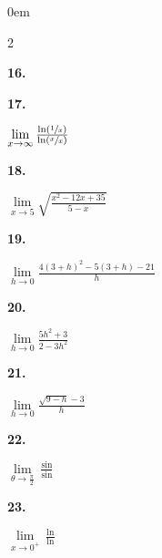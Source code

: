 \documentclass[12pt,]{book}
\theoremstyle{plain}
\theoremstyle{definition}
\numberwithin{equation}{section}
\newenvironment{exercisegroup}%
{\medskip\noindent}%
{\par\bigskip}%
\newlength{\exercisegroupindent}%
\newlength{\exercisegroupitemwidth}%
\newenvironment{exercisegrouplist}%
{\vspace{-\partopsep}%
\begin{adjustwidth}{\exercisegroupindent}{0em}}%
{\end{adjustwidth}%
\vspace{-\partopsep}%
\vspace{\baselineskip}}%
\newenvironment{exercisegroupbycol}[1]%
{\begin{exercisegrouplist}%
\vspace{-\multicolsep}%
\begin{multicols}{#1}%
\setlength{\parindent}{0em}%
\setlength{\exercisegroupitemwidth}{\linewidth}}%
{\end{multicols}%
\vspace{-\multicolsep}%
\end{exercisegrouplist}}%
\newenvironment{exercisegroupitem}[1]%
{\begin{minipage}[t]{\exercisegroupitemwidth}
\vspace{0pt}%
{\bfseries#1}%
\rule{0pt}{\baselineskip}}{\strut%
\end{minipage}%
\hspace{\columnsep}}%
\providecommand\phantomsection{}
\newcommand{\fe}[2]{\mathop{{#1}{\left(#2\right)}}}
\begin{document}
\begin{exercisegroup}
\begin{exercisegroupbycol}{2}
\begin{exercisegroupitem}{16. }
\end{exercisegroupitem}%
\par%
\begin{exercisegroupitem}{17. }\phantomsection\hypertarget{exercise-154}{\null}
\(\lim\limits_{x\to\infty}\frac{\fe{\ln}{\sfrac{1}{x}}}{\fe{\ln}{\sfrac{x}{x}}}\)%
\end{exercisegroupitem}%
\par%
\begin{exercisegroupitem}{18. }\phantomsection\hypertarget{exercise-155}{\null}
\(\lim\limits_{x\to5}\sqrt{\frac{x^2-12x+35}{5-x}}\)%
\end{exercisegroupitem}%
\par%
\begin{exercisegroupitem}{19. }\phantomsection\hypertarget{exercise-156}{\null}
\(\lim\limits_{h\to0}\frac{4(3+h)^2-5(3+h)-21}{h}\)%
\end{exercisegroupitem}%
\par%
\begin{exercisegroupitem}{20. }\phantomsection\hypertarget{exercise-157}{\null}
\(\lim\limits_{h\to0}\frac{5h^2+3}{2-3h^2}\)%
\end{exercisegroupitem}%
\par%
\begin{exercisegroupitem}{21. }\phantomsection\hypertarget{exercise-158}{\null}
\(\lim\limits_{h\to0}\frac{\sqrt{9-h}-3}{h}\)%
\end{exercisegroupitem}%
\par%
\begin{exercisegroupitem}{22. }\phantomsection\hypertarget{exercise-159}{\null}
\(\lim\limits_{\theta\to\frac{\pi}{2}}\frac{\fe{\sin}{\theta+\frac{\pi}{2}}}{\fe{\sin}{2\theta+\pi}}\)%
\end{exercisegroupitem}%
\par%
\begin{exercisegroupitem}{23. }\phantomsection\hypertarget{exercise-160}{\null}
\(\lim\limits_{x\to0^{+}}\frac{\fe{\ln}{x^e}}{\fe{\ln}{e^x}}\)%
\end{exercisegroupitem}%
\par%
\end{exercisegroupbycol}%
\end{exercisegroup}%
\end{document}
